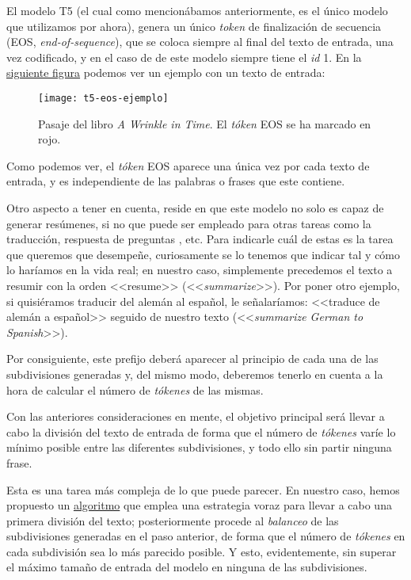 El modelo T5 (el cual como mencionábamos anteriormente, es el único modelo que utilizamos por ahora), genera un único \emph{token} de finalización de secuencia (EOS, \emph{end-of-sequence}), que se coloca siempre al final del texto de entrada, una vez codificado, y en el caso de de este modelo siempre tiene el \emph{id} 1. En la \hyperref[fig:t5-eos-ejemplo]{siguiente figura} podemos ver un ejemplo con un texto de entrada:

\begin{figure}[h]
	\centering
	\texttt{[image: t5-eos-ejemplo]}
	\caption[Ejempo de codificación del texto.]{Pasaje del libro \emph{A Wrinkle in Time}. El \emph{tóken} EOS se ha marcado en rojo.}
	\label{fig:t5-eos-ejemplo}
\end{figure}

Como podemos ver, el \emph{tóken} EOS aparece una única vez por cada texto de entrada, y es independiente de las palabras o frases que este contiene.

Otro aspecto a tener en cuenta, reside en que este modelo no solo es capaz de generar resúmenes, si no que puede ser empleado para otras tareas como la traducción, respuesta de preguntas \cite{raffel19}, etc. Para indicarle cuál de estas es la tarea que queremos que desempeñe, curiosamente se lo tenemos que indicar tal y cómo lo haríamos en la vida real; en nuestro caso, simplemente precedemos el texto a resumir con la orden <<resume>> (<<\emph{summarize}>>). Por poner otro ejemplo, si quisiéramos traducir del alemán al español, le señalaríamos: <<traduce de alemán a español>> seguido de nuestro texto (<<\emph{summarize German to Spanish}>>).

Por consiguiente, este prefijo deberá aparecer al principio de cada una de las subdivisiones generadas y, del mismo modo, deberemos tenerlo en cuenta a la hora de calcular el número de \emph{tókenes} de las mismas.

Con las anteriores consideraciones en mente, el objetivo principal será llevar a cabo la división del texto de entrada de forma que el número de \emph{tókenes} varíe lo mínimo posible entre las diferentes subdivisiones, y todo ello sin partir ninguna frase.

Esta es una tarea más compleja de lo que puede parecer. En nuestro caso, hemos propuesto un \hyperref[alg:division-codificacion]{algoritmo} que emplea una estrategia voraz para llevar a cabo una primera división del texto; posteriormente procede al \emph{balanceo} de las subdivisiones generadas en el paso anterior, de forma que el número de \emph{tókenes} en cada subdivisión sea lo más parecido posible. Y esto, evidentemente, sin superar el máximo tamaño de entrada del modelo en ninguna de las subdivisiones.

